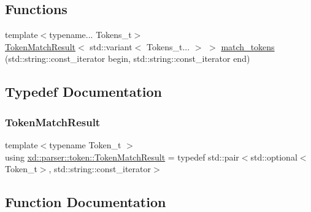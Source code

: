 \subsection*{Functions}
\begin{DoxyCompactItemize}
\item 
{\footnotesize template$<$typename... Tokens\+\_\+t$>$ }\\\mbox{\hyperlink{namespacexd_1_1parser_1_1token_a766c52bbfb7cb1f08498ef0bb9ec756e}{Token\+Match\+Result}}$<$ std\+::variant$<$ Tokens\+\_\+t... $>$ $>$ \mbox{\hyperlink{namespacexd_1_1parser_1_1token_af5d28abeee267bf2da3c264715d29ec4}{match\+\_\+tokens}} (std\+::string\+::const\+\_\+iterator begin, std\+::string\+::const\+\_\+iterator end)
\end{DoxyCompactItemize}


\subsection{Typedef Documentation}
\mbox{\label{namespacexd_1_1parser_1_1token_a766c52bbfb7cb1f08498ef0bb9ec756e}} 
\subsubsection{\texorpdfstring{Token\+Match\+Result}{TokenMatchResult}}
{\footnotesize\ttfamily template$<$typename Token\+\_\+t $>$ \\
using \mbox{\hyperlink{namespacexd_1_1parser_1_1token_a766c52bbfb7cb1f08498ef0bb9ec756e}{xd\+::parser\+::token\+::\+Token\+Match\+Result}} = typedef std\+::pair$<$std\+::optional$<$Token\+\_\+t$>$, std\+::string\+::const\+\_\+iterator$>$}



\subsection{Function Documentation}
\mbox{\label{namespacexd_1_1parser_1_1token_af5d28abeee267bf2da3c264715d29ec4}} 
